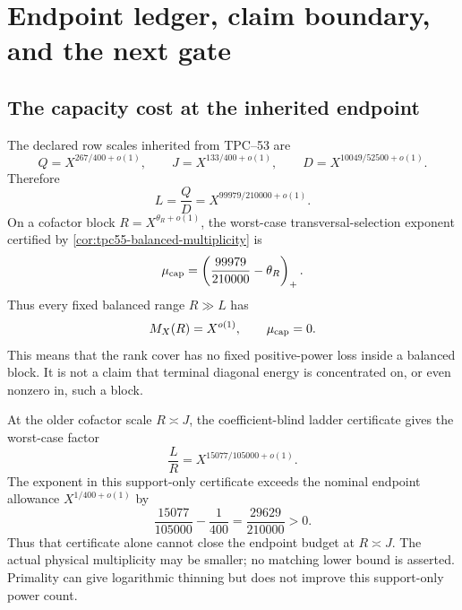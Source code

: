 \section{Endpoint ledger, claim boundary, and the next gate}
\label{sec:endpoint-claims}

\subsection{The capacity cost at the inherited endpoint}

The declared row scales inherited from TPC--53 \citep{WangTPC53} are
\begin{equation}
 Q=X^{267/400+o(1)},
 \qquad
 J=X^{133/400+o(1)},
 \qquad
 D=X^{10049/52500+o(1)}.
 \label{eq:tpc55-endpoint-scales}
\end{equation}
Therefore
\begin{equation}
 L=\frac QD
 =X^{99979/210000+o(1)}.
 \label{eq:tpc55-endpoint-L}
\end{equation}
On a cofactor block
\(R=X^{\theta_R+o(1)}\), the worst-case transversal-selection exponent
certified by
\cref{cor:tpc55-balanced-multiplicity} is
\begin{equation}
 \mu_{\rm cap}
 =\left(\frac{99979}{210000}-\theta_R\right)_+.
 \label{eq:tpc55-endpoint-capacity-cost}
\end{equation}
Thus every fixed balanced range \(R\gg L\) has
\begin{equation}
 M_X(R)=X^{o(1)},
 \qquad \mu_{\rm cap}=0.
 \label{eq:tpc55-balanced-zero-cost}
\end{equation}
This means that the rank cover has no fixed positive-power loss inside a
balanced block.  It is not a claim that terminal diagonal energy is
concentrated on, or even nonzero in, such a block.

At the older cofactor scale \(R\asymp J\), the coefficient-blind ladder
certificate gives the worst-case factor
\begin{equation}
 \frac LR
 =X^{15077/105000+o(1)}.
 \label{eq:tpc55-old-range-cost}
\end{equation}
The exponent in this support-only certificate exceeds the nominal endpoint
allowance \(X^{1/400+o(1)}\) by
\begin{equation}
 \frac{15077}{105000}-\frac1{400}
 =\frac{29629}{210000}>0.
 \label{eq:tpc55-old-range-deficit}
\end{equation}
Thus that certificate alone cannot close the endpoint budget at
\(R\asymp J\).  The actual physical multiplicity may be smaller; no matching
lower bound is asserted.  Primality can give logarithmic thinning but does
not improve this support-only power count.

